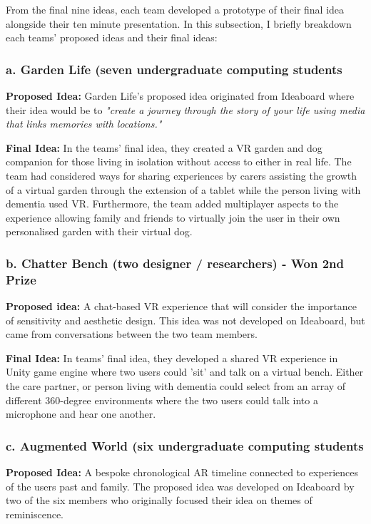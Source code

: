 From the final nine ideas, each team developed a prototype of their final idea alongside their ten minute presentation. In this subsection, I briefly breakdown each teams' proposed ideas and their final ideas:

\subsubsection{a. Garden Life (seven undergraduate computing students}
\label{sec:gardenLife}
\textbf{Proposed Idea:} Garden Life's proposed idea originated from Ideaboard where their idea would be to \textit{"create a journey through the story of your life using media that links memories with locations."}

\textbf{Final Idea:} In the teams' final idea, they created a VR garden and dog companion for those living in isolation without access to either in real life. The team had considered ways for sharing experiences by carers assisting the growth of a virtual garden through the extension of a tablet while the person living with dementia used VR. Furthermore, the team added multiplayer aspects to the experience allowing family and friends to virtually join the user in their own personalised garden with their virtual dog. 

\subsubsection{b. Chatter Bench (two designer / researchers) - Won 2nd Prize}
\label{sec:chatterbench}
\textbf{Proposed idea:} A chat-based VR experience that will consider the importance of sensitivity and aesthetic design. This idea was not developed on Ideaboard, but came from conversations between the two team members.

\textbf{Final Idea:} In teams' final idea, they developed a shared VR experience in Unity game engine where two users could 'sit' and talk on a virtual bench. Either the care partner, or person living with dementia could select from an array of different 360-degree environments where the two users could talk into a microphone and hear one another.

\subsubsection{c. Augmented World (six undergraduate computing students}
\label{sec:augmentedWorld}
\textbf{Proposed Idea:} A bespoke chronological AR timeline connected to experiences of the users past and family. The proposed idea was developed on Ideaboard by two of the six members who originally focused their idea on themes of reminiscence. 

